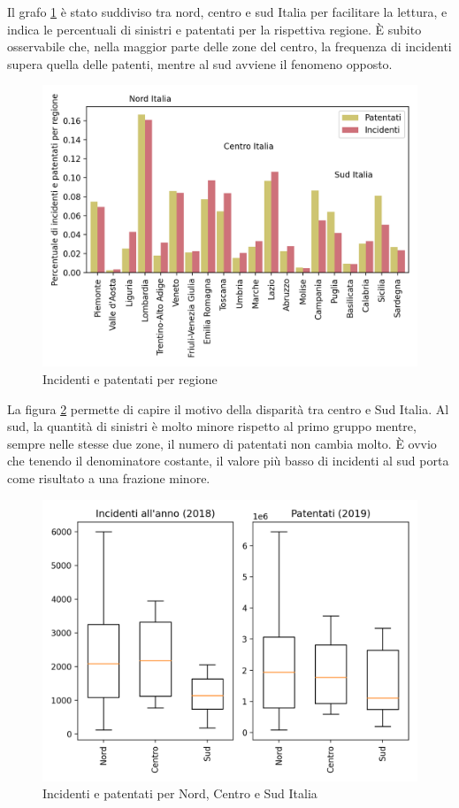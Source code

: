 \documentclass[a4paper,12pt]{report}
\begin{document}
Il grafo \ref{fig:incidenti-patentati-bar} è stato suddiviso tra nord, 
centro e sud Italia per facilitare la lettura, e indica le percentuali di sinistri e 
patentati per la rispettiva regione. 
\`E subito osservabile che, nella maggior parte delle zone del centro, 
la frequenza di incidenti supera quella delle patenti, 
mentre al sud avviene il fenomeno opposto. 

\begin{figure}
    \hfill\includegraphics[width=0.7\linewidth]{../src/incidenti/incidenti_aci/mappe_regioni/incidenti_patenti_bar.png}\hspace*{\fill}
    \caption{Incidenti e patentati per regione}
    \label{fig:incidenti-patentati-bar}
\end{figure}

La figura \ref{fig:incidenti-patentati-box} permette di capire il motivo della disparità 
tra centro e Sud Italia. 
Al sud, la quantità di sinistri è molto minore rispetto al primo gruppo mentre, 
sempre nelle stesse due zone, il numero di patentati non cambia molto. 
\`E ovvio che tenendo il denominatore costante, il valore più basso di incidenti al 
sud porta come risultato a una frazione minore. 

\begin{figure}
    \hfill\includegraphics[width=0.7\linewidth]{../src/incidenti/incidenti_aci/mappe_regioni/incidenti_patenti_box.png}\hspace*{\fill}
    \caption{Incidenti e patentati per Nord, Centro e Sud Italia}
    \label{fig:incidenti-patentati-box}
\end{figure}
\end{document}
